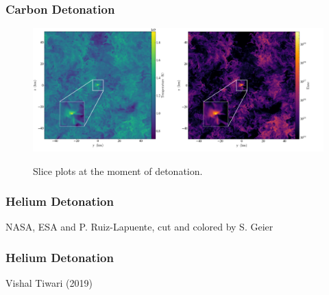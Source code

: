 \documentclass{beamer}
\begin{document}


\begin{frame}
\frametitle{Carbon Detonation}

        \begin{figure}
    \begin{center}
      \includegraphics[width=.90\linewidth]{slice.png}
    \end{center}
		\begin{center}
			Slice plots at the moment of detonation.
		\end{center}
  \end{figure}


\end{frame}

\begin{frame}
        \frametitle{Helium Detonation}

        \begin{center}
        \end{center}
        \begin{center}
                NASA, ESA and P. Ruiz-Lapuente, cut and colored by S. Geier
        \end{center}
\end{frame}

\begin{frame}

        \frametitle{Helium Detonation}
        \begin{center}
		\end{center}
		\begin{center}
			Vishal Tiwari (2019)
		\end{center}
\end{frame}
\end{document}
